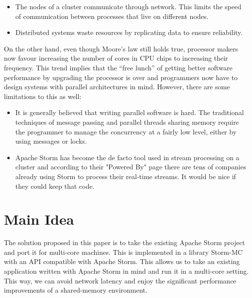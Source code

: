 \documentclass[bsc,logo,frontabs,twoside,singlespacing,normalheadings,parskip]{infthesis}\usepackage[]{graphicx}\usepackage[]{color}
\begin{document}
\begin{itemize}

\item The nodes of a cluster communicate through network. This limits the speed of communication between processes that live on different nodes.

\item Distributed systems waste resources by replicating data to ensure reliability.


\end{itemize}

On the other hand, even though Moore’s law still holds true, processor makers now favour increasing the number of cores in CPU chips to increasing their frequency. This trend implies that the “free lunch” of getting better software performance by upgrading the processor is over and programmers now have to design systems with parallel architectures in mind. However, there are some limitations to this as well:

\begin{itemize}

\item It is generally believed that writing parallel software is hard. The traditional techniques of message passing and parallel threads sharing memory require the programmer to manage the concurrency at a fairly low level, either by using messages or locks.

\item Apache Storm has become the de facto tool used in stream processing on a cluster and according to their "Powered By" page \cite{Anonymous:eikzOt4-} there are tens of companies already using Storm to process their real-time streams. It would be nice if they could keep that code.

\end{itemize}

\section{Main Idea}

The solution proposed in this paper is to take the existing Apache Storm project and port it for multi-core machines. This is implemented in a library Storm-MC with an API compatible with Apache Storm. This allows us to take an existing application written with Apache Storm in mind and run it in a multi-core setting. This way, we can avoid network latency and enjoy the significant performance improvements of a shared-memory environment.
\end{document}
